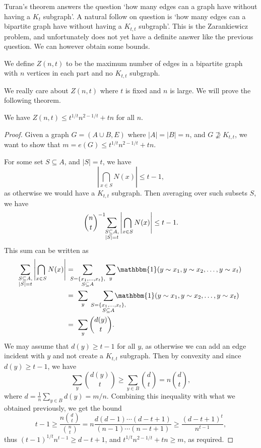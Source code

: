 \documentclass[a4paper]{scrartcl}
\begin{document}
Turan's theorem answers the question `how many edges can a graph have without having a $K_{t}$ subgraph'. A natural follow on question is `how many edges can a bipartite graph have without having a $K_{t, t}$ subgraph'. This is the Zarankiewicz problem, and unfortunately does not yet have a definite answer like the previous question. We can however obtain some bounds.

\begin{definition}
    We define $Z(n, t)$ to be the maximum number of edges in a bipartite graph with $n$ vertices in each part and no $K_{t, t}$ subgraph.
\end{definition}

We really care about $Z(n, t)$ where $t$ is fixed and $n$ is large. We will prove the following theorem.

\begin{theorem}
   We have $Z(n, t) \leq t^{1/t} n^{2 - 1/t} + tn$ for all $n$.
\end{theorem}
\begin{proof}
    Given a graph $G = (A \cup B, E)$ where $|A| = |B| = n$, and $G \not \supseteq K_{t, t}$, we want to show that $m = e(G) \leq t^{1/t} n^{2 - 1/t} + tn$.

    For some set $S \subseteq A$, and $|S| = t$, we have
    $$
    \left|\bigcap_{x \in S} N(x)\right| \leq t - 1,
    $$
    as otherwise we would have a $K_{t, t}$ subgraph. Then averaging over such subsets $S$, we have
    $$
    \binom{n}{t}^{-1} \sum_{\mathclap{\substack{S \subseteq A,\\|S| = t}}}\;  \left|\bigcap_{x \in S} N(x)\right| \leq t - 1.
    $$
    This sum can be written as
    \begin{align*}
        \sum_{\mathclap{\substack{S \subseteq A,\\|S| = t}}}\;  \left|\bigcap_{x \in S} N(x)\right| &=\ \  \ \sum_{\mathclap{\substack{S =\{x_1, \dots, x_t\},\\S\subseteq A}}}\  \ \ \ \  \sum_{y} \mathbbm{1}(y \sim x_1, y \sim x_2, \dots, y\sim x_t) \\
        &= \ \sum_{y}\ \ \ \ \  \ \sum_{\mathclap{\substack{S =\{x_1, \dots, x_t\},\\S\subseteq A}}} \mathbbm{1}(y \sim x_1, y \sim x_2, \dots, y\sim x_t) \\
        &=\  \sum_y \binom{d(y)}{t}.
    \end{align*}
    We may assume that $d(y) \geq t - 1$ for all $y$, as otherwise we can add an edge incident with $y$ and not create a $K_{t, t}$ subgraph. Then by convexity and since $d(y) \geq t - 1$, we have
    $$
    \sum_y \binom{d(y)}{t} \geq \sum_{y \in B} \binom{d}{t} = n \binom{d}{t},
    $$
    where $d = \frac{1}{n} \sum_{y \in B} d(y) = m/n$. Combining this inequality with what we obtained previously, we get the bound
    $$
    t - 1 \geq \frac{n \binom{d}{t}}{\binom{n}{t}}  = n \frac{d(d - 1) \cdots (d - t + 1)}{(n - 1) \cdots (n - t + 1)} \geq \frac{(d - t + 1)^t}{n^{t - 1}},
    $$
    thus $(t - 1)^{1/t} n^{t - 1} \geq d - t + 1$, and $t^{1/t} n^{2 - 1/t} + tn \geq m$, as required.
\end{proof}
\end{document}
